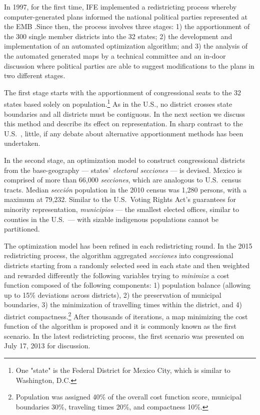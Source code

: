 \documentclass[letter,12pt]{article}
\begin{document}

In 1997, for the first time, IFE implemented a redistricting process whereby computer-generated plans informed the national political parties represented at the EMB \citep{trelles.mtz.tesisItam.2007}.Since then, the process involves three stages: 1) the apportionment of the 300 single member districts into the 32 states; 2) the development and implementation of an automated optimization algorithm; and 3) the analysis of the automated generated maps by a technical committee and an in-door discussion where political parties are able to suggest modifications to the plans in two different stages. 

The first stage starts with the apportionment of congressional seats to the 32 states based solely on population.\footnote{One "state" is the Federal District for Mexico City, which is similar to Washington, D.C.} As in the U.S., no district crosses state boundaries and all districts must be contiguous. In the next section we discuss this method and describe its effect on representation. In sharp contrast to the U.S.\ \citep{szpiro.numbersRule.2010}, little, if any debate about alternative apportionment methods has been undertaken. 

In the second stage, an optimization model to construct congressional districts from the base-geography --- states' \emph{electoral \emph{secciones}} --- is devised. Mexico is comprised of more than 66,000 \emph{secciones}, which are analogous to U.S.\ census tracts. Median \emph{secci\'on} population in the 2010 census was 1,280 persons, with a maximum at 79,232. Similar to the U.S.\ Voting Rights Act's guarantees for minority representation, \emph{municipios} --- the smallest elected offices, similar to counties in the U.S.\ --- with sizable indigenous populations cannot be partitioned. 


The optimization model has been refined in each redistricting round. In the 2015 redistricting process, the algorithm aggregated \emph{secciones} into congressional districts starting from a randomly selected seed in each state and then weighted and rewarded differently the following variables trying to \emph{minimize} a cost function composed of the following components: 1) population balance (allowing up to 15\% deviations across districts), 2) the preservation of municipal boundaries, 3) the minimization of travelling times within the district, and 4) district compactness.\footnote{Population was assigned 40\% of the overall cost function score, municipal boundaries 30\%, traveling times 20\%, and  compactness 10\%.} After thousands of iterations, a map minimizing the cost function of the algorithm is proposed and it is commonly known as the first scenario. In the latest redistricting process, the first scenario was presented on July 17, 2013 for discussion.
\end{document}
